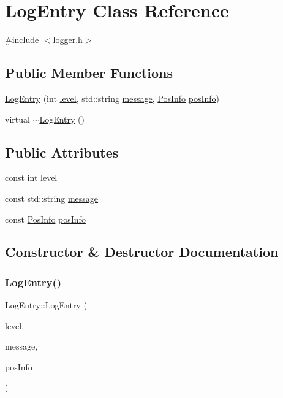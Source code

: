 \hypertarget{classLogEntry}{}\section{Log\+Entry Class Reference}
\label{classLogEntry}


{\ttfamily \#include $<$logger.\+h$>$}

\subsection*{Public Member Functions}
\begin{DoxyCompactItemize}
\item 
\hyperlink{classLogEntry_a02d0d5d77728cf54c92184a645ae8ab8}{Log\+Entry} (int \hyperlink{classLogEntry_a8bb959695c7dfe5eaf19f70fdc3f8a71}{level}, std\+::string \hyperlink{classLogEntry_a7ad3f1e2f6f00453e0c0bafc6ba5dfa8}{message}, \hyperlink{classPosInfo}{Pos\+Info} \hyperlink{classLogEntry_a0918b72d75e039af6a03e743f8615ebc}{pos\+Info})
\item 
virtual \hyperlink{classLogEntry_a835d70a7c0e233eea081c4540b2b959d}{$\sim$\+Log\+Entry} ()
\end{DoxyCompactItemize}
\subsection*{Public Attributes}
\begin{DoxyCompactItemize}
\item 
const int \hyperlink{classLogEntry_a8bb959695c7dfe5eaf19f70fdc3f8a71}{level}
\item 
const std\+::string \hyperlink{classLogEntry_a7ad3f1e2f6f00453e0c0bafc6ba5dfa8}{message}
\item 
const \hyperlink{classPosInfo}{Pos\+Info} \hyperlink{classLogEntry_a0918b72d75e039af6a03e743f8615ebc}{pos\+Info}
\end{DoxyCompactItemize}


\subsection{Constructor \& Destructor Documentation}
\mbox{\label{classLogEntry_a02d0d5d77728cf54c92184a645ae8ab8}} 
\subsubsection{\texorpdfstring{Log\+Entry()}{LogEntry()}}
{\footnotesize\ttfamily Log\+Entry\+::\+Log\+Entry (\begin{DoxyParamCaption}\item[{int}]{level,  }\item[{std\+::string}]{message,  }\item[{\hyperlink{classPosInfo}{Pos\+Info}}]{pos\+Info }\end{DoxyParamCaption})}

